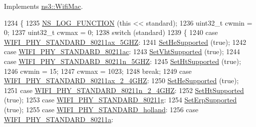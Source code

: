 Implements \hyperlink{classns3_1_1WifiMac_a72260f22e273c8b11aa0453adf092768}{ns3\+::\+Wifi\+Mac}.


\begin{DoxyCode}
1234 \{
1235   \hyperlink{log-macros-disabled_8h_a90b90d5bad1f39cb1b64923ea94c0761}{NS\_LOG\_FUNCTION} (\textcolor{keyword}{this} << standard);
1236   uint32\_t cwmin = 0;
1237   uint32\_t cwmax = 0;
1238   \textcolor{keywordflow}{switch} (standard)
1239     \{
1240     \textcolor{keywordflow}{case} \hyperlink{group__wifi_gga1299834f4e1c615af3ca738033b76a49af5b1e598f5b0d88c961c90ad1742355f}{WIFI\_PHY\_STANDARD\_80211ax\_5GHZ}:
1241       \hyperlink{classns3_1_1RegularWifiMac_a74075dc0566e812e623ad5a6a05cfe9b}{SetHeSupported} (\textcolor{keyword}{true});
1242     \textcolor{keywordflow}{case} \hyperlink{group__wifi_gga1299834f4e1c615af3ca738033b76a49a7c078959de635b84fb280a955dcfb27e}{WIFI\_PHY\_STANDARD\_80211ac}:
1243       \hyperlink{classns3_1_1RegularWifiMac_a8f007964ef13ead0c2ee5916eba1966b}{SetVhtSupported} (\textcolor{keyword}{true});
1244     \textcolor{keywordflow}{case} \hyperlink{group__wifi_gga1299834f4e1c615af3ca738033b76a49aaabe94a0be4668583c42595437b4a6c0}{WIFI\_PHY\_STANDARD\_80211n\_5GHZ}:
1245       \hyperlink{classns3_1_1RegularWifiMac_a2b342d2ad0898df9ff0ade65ff39a8c1}{SetHtSupported} (\textcolor{keyword}{true});
1246       cwmin = 15;
1247       cwmax = 1023;
1248       \textcolor{keywordflow}{break};
1249     \textcolor{keywordflow}{case} \hyperlink{group__wifi_gga1299834f4e1c615af3ca738033b76a49a21cd71f16aa85df0b571d52f9217f330}{WIFI\_PHY\_STANDARD\_80211ax\_2\_4GHZ}:
1250       \hyperlink{classns3_1_1RegularWifiMac_a74075dc0566e812e623ad5a6a05cfe9b}{SetHeSupported} (\textcolor{keyword}{true});
1251     \textcolor{keywordflow}{case} \hyperlink{group__wifi_gga1299834f4e1c615af3ca738033b76a49a6e449a5ca14fc7c0eb36064ce04a5192}{WIFI\_PHY\_STANDARD\_80211n\_2\_4GHZ}:
1252       \hyperlink{classns3_1_1RegularWifiMac_a2b342d2ad0898df9ff0ade65ff39a8c1}{SetHtSupported} (\textcolor{keyword}{true});
1253     \textcolor{keywordflow}{case} \hyperlink{group__wifi_gga1299834f4e1c615af3ca738033b76a49aeda6d90f260393ce003ec4765d8100af}{WIFI\_PHY\_STANDARD\_80211g}:
1254       \hyperlink{classns3_1_1RegularWifiMac_a61126017f4b5902c91947d4fbfe3f007}{SetErpSupported} (\textcolor{keyword}{true});
1255     \textcolor{keywordflow}{case} \hyperlink{group__wifi_gga1299834f4e1c615af3ca738033b76a49aca926d77ddca0fc6d8cdcb190b2e520e}{WIFI\_PHY\_STANDARD\_holland}:
1256     \textcolor{keywordflow}{case} \hyperlink{group__wifi_gga1299834f4e1c615af3ca738033b76a49a22db1e8022db2c3450414b86c77b11e4}{WIFI\_PHY\_STANDARD\_80211a}:

\end{DoxyCode}
